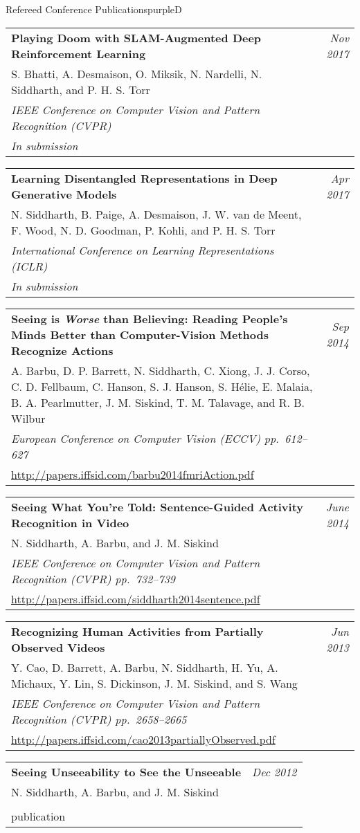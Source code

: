 \documentclass[a4paper]{article}
\makeatletter
\newlength{\itemtextwidth}
\newenvironment{publication}[5]
{ \item
  \begin{tabular*}{\itemtextwidth}{@{}p{5.6in}@{\extracolsep{\fill}}r@{}}
    \textbf{#1} & \textit{#2}\\ #3 &\\ \textit{#4}&\\ #5
  \end{tabular*}
  \vspace*{-2pt}
} {}
\def\item{\addtocounter{enumi}{-2}\oldItem}
\makeatother
\begin{document}
\begin{region}[C][11]{Refereed Conference Publications}{purpleD}
  \begin{publication} {Playing Doom with SLAM-Augmented Deep Reinforcement Learning}
    {Nov 2017}
    {S. Bhatti, A. Desmaison, O. Miksik, N. Nardelli, N. Siddharth, and P. H. S. Torr}
    {IEEE Conference on Computer Vision and Pattern Recognition (CVPR)}
    {\emph{In submission}}
  \end{publication}
  \begin{publication} {Learning Disentangled Representations in Deep Generative Models}
    {Apr 2017}
    {N. Siddharth, B. Paige, A. Desmaison, J. W. van de Meent, F. Wood, N. D.
      Goodman, P. Kohli, and P. H. S. Torr}
    {International Conference on Learning Representations (ICLR)}
    {\emph{In submission}}
  \end{publication}
  \begin{publication} {Seeing is \emph{Worse} than Believing: Reading People’s Minds
      Better than Computer-Vision Methods Recognize Actions}
    {Sep 2014}
    {A. Barbu, D. P. Barrett, N. Siddharth, C. Xiong, J. J. Corso, C. D. Fellbaum,
      C. Hanson, S. J. Hanson, S. H\'elie, E. Malaia, B. A. Pearlmutter,
      J. M. Siskind, T. M. Talavage, and R. B. Wilbur}
    {European Conference on Computer Vision (ECCV) \hfill \emph{pp.~612--627}}
    {\url{http://papers.iffsid.com/barbu2014fmriAction.pdf}}
  \end{publication}
  \begin{publication} {Seeing What You're Told: Sentence-Guided Activity Recognition in Video}
    {June 2014}
    {N. Siddharth, A. Barbu, and J. M. Siskind}
    {IEEE Conference on Computer Vision and Pattern Recognition (CVPR) \hfill \emph{pp.~732--739}}
    {\url{http://papers.iffsid.com/siddharth2014sentence.pdf}}
  \end{publication}
  \begin{publication} {Recognizing Human Activities from Partially Observed Videos}
    {Jun 2013}
    {Y. Cao, D. Barrett, A. Barbu, N. Siddharth, H. Yu, A. Michaux, Y. Lin,
      S. Dickinson, J. M. Siskind, and S. Wang}
    {IEEE Conference on Computer Vision and Pattern Recognition (CVPR) \hfill \emph{pp.~2658--2665}}
    {\url{http://papers.iffsid.com/cao2013partiallyObserved.pdf}}
  \end{publication}
  \begin{publication} {Seeing Unseeability to See the Unseeable}
    {Dec 2012}
    {N. Siddharth, A. Barbu, and J. M. Siskind}

\end{publication}
\end{region}
\end{document}

